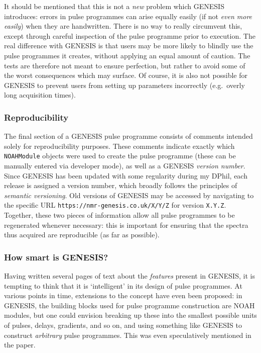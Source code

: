 It should be mentioned that this is not a \textit{new} problem which GENESIS introduces: errors in pulse programmes can arise equally easily (if not \textit{even more easily}) when they are handwritten.
There is no way to really circumvent this, except through careful inspection of the pulse programme prior to execution.
The real difference with GENESIS is that users may be more likely to blindly use the pulse programmes it creates, without applying an equal amount of caution.
The tests are therefore not meant to ensure perfection, but rather to avoid some of the worst consequences which may surface.
Of course, it is also not possible for GENESIS to prevent users from setting up parameters incorrectly (e.g.\ overly long acquisition times).


\subsubsection{Reproducibility}

The final section of a GENESIS pulse programme consists of comments intended solely for reproducibility purposes.
These comments indicate exactly which \texttt{NOAHModule} objects were used to create the pulse programme (these can be manually entered via developer mode), as well as a GENESIS \textit{version number}.
Since GENESIS has been updated with some regularity during my DPhil, each release is assigned a version number, which broadly follows the principles of \textit{semantic versioning}.
Old versions of GENESIS may be accessed by navigating to the specific URL \texttt{https://nmr-genesis.co.uk/X/Y/Z} for version \texttt{X.Y.Z}.
Together, these two pieces of information allow all pulse programmes to be regenerated whenever necessary: this is important for ensuring that the spectra thus acquired are reproducible (as far as possible).


\subsubsection{How smart is GENESIS?}

Having written several pages of text about the \textit{features} present in GENESIS, it is tempting to think that it is `intelligent' in its design of pulse programmes.
At various points in time, extensions to the concept have even been proposed: in GENESIS, the building blocks used for pulse programme construction are NOAH modules, but one could envision breaking up these into the smallest possible units of pulses, delays, gradients, and so on, and using something like GENESIS to construct \textit{arbitrary} pulse programmes.
This was even speculatively mentioned in the paper.

